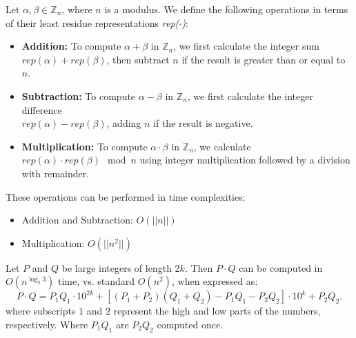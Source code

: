 \begin{theo}

    \label{theo:zn_operations}
    Let $\alpha, \beta \in \mathbb{Z}_n$, where $n$ is a modulus. We define the following operations in terms of their least residue representations \textit{rep($\cdot$)}:
    \begin{itemize}
        \item \textbf{Addition:} To compute \(\alpha + \beta\) in \(\mathbb{Z}_n\), we first calculate the integer sum \(\textit{rep}(\alpha) + \textit{rep}(\beta)\), then subtract $n$ if the result is greater than or equal to $n$.
        \item \textbf{Subtraction:} To compute \(\alpha - \beta\) in \(\mathbb{Z}_n\), we first calculate the integer difference\\
         \(\textit{rep}(\alpha) - \textit{rep}(\beta)\), adding $n$ if the result is negative.
        \item \textbf{Multiplication:} To compute \(\alpha \cdot \beta\) in \(\mathbb{Z}_n\), we calculate \(\textit{rep}(\alpha) \cdot \textit{rep}(\beta) \mod n\) using integer multiplication followed by a division with remainder.
    \end{itemize}
    These operations can be performed in time complexities:
    \begin{itemize}
        \item Addition and Subtraction: \(O(||n||)\)
        \item Multiplication: \(O(||n^2||)\)
    \end{itemize}
\end{theo}
\begin{theo}

    Let \( P \) and \( Q \) be large integers of length \( 2k \). Then \( P \cdot Q \) can be computed in \( O(n^{\log_2 3}) \) time, vs. standard \( O(n^2) \), when expressed as:
    \[
    P \cdot Q = P_1 Q_1 \cdot 10^{2k} + \left[ (P_1 + P_2)(Q_1 + Q_2) - P_1 Q_1 - P_2 Q_2 \right] \cdot 10^k + P_2 Q_2.
    \]
    where subscripts \( 1 \) and \( 2 \) represent the high and low parts of the numbers, respectively. Where $P_1 Q_1$ are $P_2 Q_2$ computed once.
\end{theo}
    
\newpage

